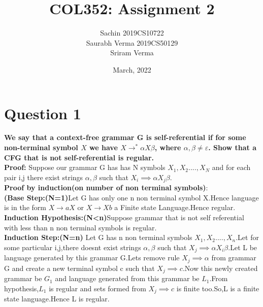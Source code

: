 \documentclass{article}
\title{COL352: Assignment 2}
\author{Sachin 2019CS10722 \\
        Saurabh Verma 2019CS50129\\
        Sriram Verma}
\date{March, 2022}
\begin{document}
\maketitle


\section{Question 1}
\textbf{We say that a context-free grammar G is self-referential if for some non-terminal symbol $X$ we have $X \to^* \alpha X \beta$, where $\alpha, \beta \neq \varepsilon$. Show that a CFG that is not self-referential is regular.}
\\
\textbf{Proof:}
Suppose our grammar G has has N symbols
$X_1,X_2....,X_N$ and for each pair i,j there exist strings $\alpha,\beta$ such that $X_i \implies \alpha X_j \beta$.\\
\textbf{Proof by induction(on number of non terminal symbols)}:\\
\textbf{(Base Step:(N=1)}Let G has only one n non terminal symbol X.Hence language is in the form $X \rightarrow aX $ or $X \rightarrow Xb $  a Finite state Language.Hence regular.\\
\textbf{Induction Hypothesis:(N<n)}Suppose grammar that is not self referential with less than n non terminal symbols is regular.\\
\textbf{Induction Step:(N=n)}
Let  G has n non terminal symbols $X_1,X_2....,X_n$.Let for some particular i,j,there doesnt exist strings $\alpha,\beta$ such that $X_j \implies \alpha X_i \beta$.Let L be language generated by this grammar G.Lets remove rule $X_j \implies \alpha$ from grammar G and create a new terminal symbol c such that $X_j \implies c$.Now this newly created grammar be $G_1$ and language generated from this grammar be $L_1$.From hypothesis,$L_1$ is regular and sets formed from $X_j \implies c$ is finite too.So,L is a finite state language.Hence L is regular.



\pagebreak
\end{document}
